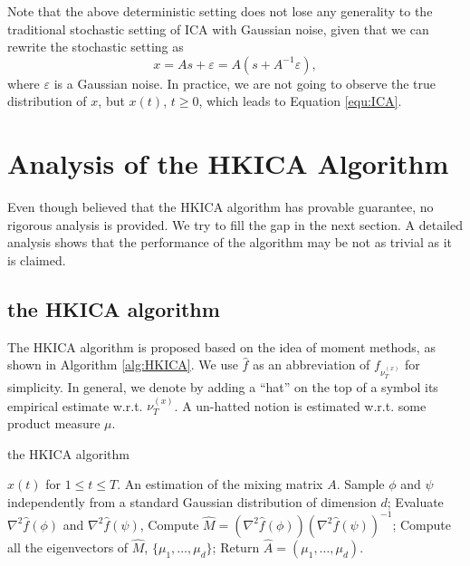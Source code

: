 \documentclass[twoside]{article}
\theoremstyle{definition}
\newcommand{\eps}{\varepsilon}
\begin{document}
Note that the above deterministic setting does not lose any generality to the traditional stochastic setting of ICA with Gaussian noise, given that we can rewrite the stochastic setting as 
\[
x = As+\eps = A(s+A^{-1}\eps),
\] 
where $\eps$ is a Gaussian noise. In practice, we are not going to observe the true distribution of $x$, but $x(t)$, $t\ge 0$, which leads to Equation \eqref{equ:ICA}.
\fi


\section{Analysis of the HKICA Algorithm}
\label{sec:AnalysisHK}
Even though \citet{hsu2013learning} believed that the HKICA algorithm has provable guarantee, no rigorous analysis is provided. 
We try to fill the gap in the next section. 
A detailed analysis shows that the performance of the algorithm may be not as trivial as it is claimed.

\subsection{the HKICA algorithm}
\label{subsec:HKalg}
The HKICA algorithm is proposed based on the idea of moment methods, as shown in Algorithm \ref{alg:HKICA}. 
We use  $\widehat{f}$  as an abbreviation of $f_{\nu_T^{(x)}}$ for simplicity.
In general, we denote by adding a ``hat'' on the top of a symbol its empirical estimate w.r.t. $\nu_T^{(x)}$. A un-hatted notion is estimated w.r.t. some product measure $\mu$. 
\begin{algorithm}[H]
\caption{the HKICA algorithm}
\label{alg:HKICA}
\begin{algorithmic}[1]
\INPUT $x(t)$ for $1\le t \le T$. 
\OUTPUT An estimation of the mixing matrix $A$. 
\STATE Sample $\phi$ and $\psi$ independently from a standard Gaussian distribution of dimension $d$;
\STATE Evaluate $\nabla^2\widehat{f}(\phi)$ and $\nabla^2\widehat{f}(\psi)$, 
\STATE Compute $\widehat{M} = (\nabla^2 \widehat{f}(\phi))(\nabla^2\widehat{f}(\psi))^{-1}$;
\STATE Compute all the eigenvectors of $\widehat{M}$, $\{\mu_1,\ldots,\mu_d\}$;
\STATE Return $\widehat{A} = (\mu_1,\ldots,\mu_d)$.
\end{algorithmic}
\end{algorithm}
\end{document}
